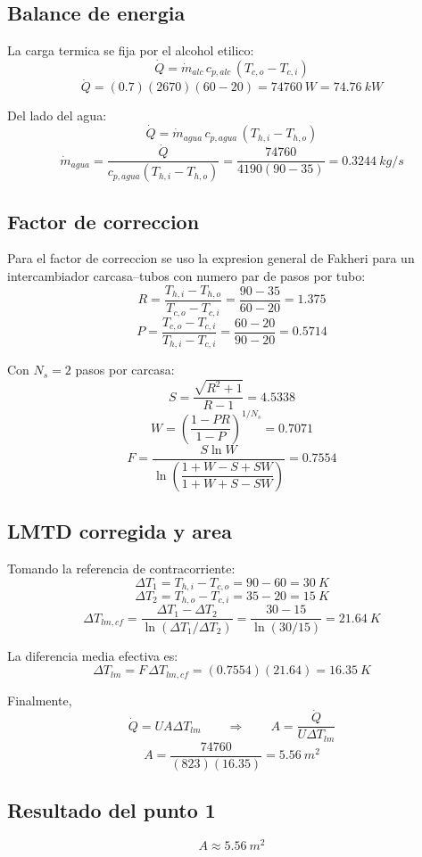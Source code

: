 \documentclass[11pt]{article}
\begin{document}
\subsection*{Balance de energia}

La carga termica se fija por el alcohol etilico:
\[
\dot Q=\dot m_{alc}\,c_{p,alc}\,(T_{c,o}-T_{c,i})
\]
\[
\dot Q=(0.7)(2670)(60-20)=\SI{74760}{W}=\SI{74.76}{kW}
\]

Del lado del agua:
\[
\dot Q=\dot m_{agua}\,c_{p,agua}\,(T_{h,i}-T_{h,o})
\]
\[
\dot m_{agua}=\frac{\dot Q}{c_{p,agua}(T_{h,i}-T_{h,o})}
=\frac{74760}{4190(90-35)}
=\SI{0.3244}{kg/s}
\]

\subsection*{Factor de correccion}

Para el factor de correccion se uso la expresion general de Fakheri para un intercambiador carcasa--tubos con numero par de pasos por tubo:
\[
R=\frac{T_{h,i}-T_{h,o}}{T_{c,o}-T_{c,i}}
=\frac{90-35}{60-20}=1.375
\]
\[
P=\frac{T_{c,o}-T_{c,i}}{T_{h,i}-T_{c,i}}
=\frac{60-20}{90-20}=0.5714
\]

Con \(N_s=2\) pasos por carcasa:
\[
S=\frac{\sqrt{R^2+1}}{R-1}=4.5338
\]
\[
W=\left(\frac{1-PR}{1-P}\right)^{1/N_s}
=0.7071
\]
\[
F=\frac{S\ln W}{\ln\left(\dfrac{1+W-S+SW}{1+W+S-SW}\right)}
=0.7554
\]

\subsection*{LMTD corregida y area}

Tomando la referencia de contracorriente:
\[
\Delta T_1=T_{h,i}-T_{c,o}=90-60=\SI{30}{K}
\]
\[
\Delta T_2=T_{h,o}-T_{c,i}=35-20=\SI{15}{K}
\]
\[
\Delta T_{lm,cf}=\frac{\Delta T_1-\Delta T_2}{\ln(\Delta T_1/\Delta T_2)}
=\frac{30-15}{\ln(30/15)}
=\SI{21.64}{K}
\]

La diferencia media efectiva es:
\[
\Delta T_{lm}=F\,\Delta T_{lm,cf}
=(0.7554)(21.64)=\SI{16.35}{K}
\]

Finalmente,
\[
\dot Q=UA\Delta T_{lm}
\qquad \Longrightarrow \qquad
A=\frac{\dot Q}{U\Delta T_{lm}}
\]
\[
A=\frac{74760}{(823)(16.35)}=\SI{5.56}{m^2}
\]

\subsection*{Resultado del punto 1}

\[
\boxed{A \approx \SI{5.56}{m^2}}
\]
\end{document}
